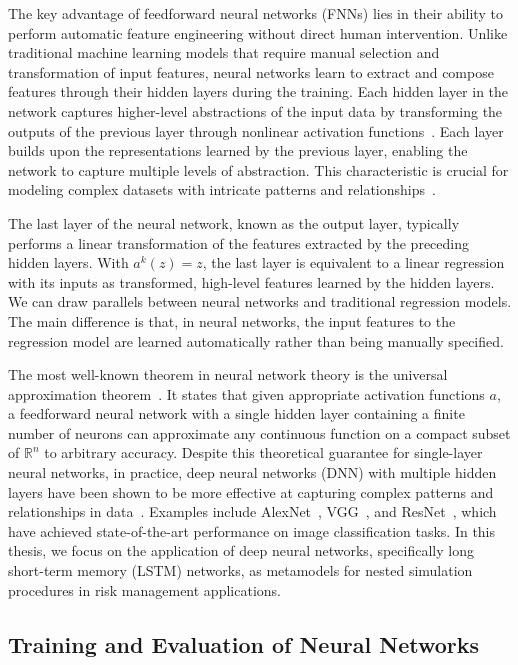 The key advantage of feedforward neural networks (FNNs) lies in their ability to perform automatic feature engineering without direct human intervention. 
Unlike traditional machine learning models that require manual selection and transformation of input features, neural networks learn to extract and compose features through their hidden layers during the training. 
Each hidden layer in the network captures higher-level abstractions of the input data by transforming the outputs of the previous layer through nonlinear activation functions~\citep{lecun2015deep}.
Each layer builds upon the representations learned by the previous layer, enabling the network to capture multiple levels of abstraction. 
This characteristic is crucial for modeling complex datasets with intricate patterns and relationships~\citep{bengio2013representation}.

The last layer of the neural network, known as the output layer, typically performs a linear transformation of the features extracted by the preceding hidden layers. 
With $a^{k}(z) = z$, the last layer is equivalent to a linear regression with its inputs as transformed, high-level features learned by the hidden layers.
We can draw parallels between neural networks and traditional regression models. 
The main difference is that, in neural networks, the input features to the regression model are learned automatically rather than being manually specified.

The most well-known theorem in neural network theory is the universal approximation theorem~\citep{hornik1989multilayer}.
It states that given appropriate activation functions $a$, a feedforward neural network with a single hidden layer containing a finite number of neurons can approximate any continuous function on a compact subset of $\mathbb{R}^n$ to arbitrary accuracy. 
Despite this theoretical guarantee for single-layer neural networks, in practice, deep neural networks (DNN) with multiple hidden layers have been shown to be more effective at capturing complex patterns and relationships in data~\citep{lecun2015deep}.
Examples include AlexNet~\citep{krizhevsky2012imagenet}, VGG~\citep{simonyan2014very}, and ResNet~\citep{he2016deep}, which have achieved state-of-the-art performance on image classification tasks.
In this thesis, we focus on the application of deep neural networks, specifically long short-term memory (LSTM) networks, as metamodels for nested simulation procedures in risk management applications.

\subsection{Training and Evaluation of Neural Networks}

